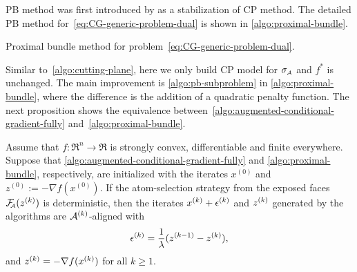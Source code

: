PB method was first introduced by \citet{kiwiel1990proximity} as a stabilization of CP method. The detailed PB method for~\eqref{eq:CG-generic-problem-dual} is shown in \autoref{algo:proximal-bundle}. 

\begin{algorithm}[t]
  \DontPrintSemicolon\setcounter{AlgoLine}{-1}
  \caption{Proximal bundle method for problem~\eqref{eq:CG-generic-problem-dual}.}
  \label{algo:proximal-bundle}
\end{algorithm}

Similar to~\autoref{algo:cutting-plane}, here we only build CP model for $\sigma_{\scriptscriptstyle\mathcal{A}}$ and $f^*$ is unchanged. The main improvement is \autoref{algo:pb-subproblem} in \autoref{algo:proximal-bundle}, where the difference is the addition of a quadratic penalty function. The next proposition shows the equivalence between~\autoref{algo:augmented-conditional-gradient-fully} and~\autoref{algo:proximal-bundle}. 

\begin{proposition} \label{prop:equi_alfccg_pn} Assume that $f:\Re^n\to\Re$ is strongly convex, differentiable and finite everywhere. Suppose that \autoref{algo:augmented-conditional-gradient-fully} and \autoref{algo:proximal-bundle},
  respectively, are initialized with the iterates $x^{(0)}$ and $z^{(0)} :=
  -\nabla f(x^{(0)})$. If the atom-selection strategy from the exposed faces
  $\mathcal{F}_{\!\!\scriptscriptstyle\mathcal{A}}(z^{(k)})$ is deterministic, then the iterates $x^{(k)} + \epsilon^{(k)}$ and $z^{(k)}$ generated by the algorithms are $\mathcal{A}^{(k)}$-aligned with 
  \[\epsilon^{(k)} = \frac{1}{\lambda}(z^{(k-1)} - z^{(k)}),\]
  and $z^{(k)} = -\nabla f(x^{(k)})$ for all $k\ge1$. 
\end{proposition}

